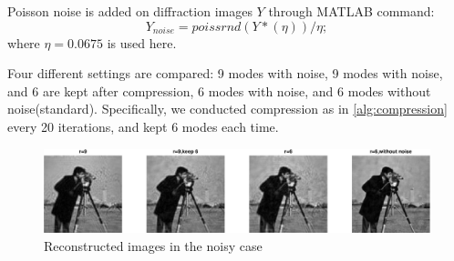 \documentclass{article}
\numberwithin{equation}{section}
\begin{document}
 Poisson noise is added on diffraction images $Y$ through MATLAB command:
 $$
  Y_{noise}=poissrnd(Y*(\eta))/\eta;
 $$
 where
 $\eta=0.0675$ is used here.
 
 Four different settings are compared: 9 modes with noise, 9 modes with noise, and 6 are kept after compression, 6 modes with noise, and 6 modes without noise(standard). Specifically, we conducted compression as in \ref{alg:compression} every 20 iterations, and kept 6 modes each time.
 
 
 \begin{figure}[H]
 \centering
 \includegraphics[width=1\linewidth]{../figures/noise_u.eps}
 \caption{Reconstructed images in the noisy case}
 
    \label{fig:noise_u}
 
  \end{figure}
  
\end{document}
